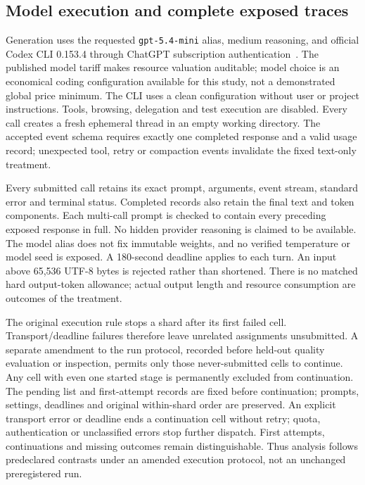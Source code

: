 \subsection{Model execution and complete exposed traces}
Generation uses the requested \texttt{gpt-5.4-mini} alias, medium reasoning, and official Codex CLI 0.153.4 through ChatGPT subscription authentication~\cite{openai54mini2026,codexexec2026}. The published model tariff makes resource valuation auditable; model choice is an economical coding configuration available for this study, not a demonstrated global price minimum. The CLI uses a clean configuration without user or project instructions. Tools, browsing, delegation and test execution are disabled. Every call creates a fresh ephemeral thread in an empty working directory. The accepted event schema requires exactly one completed response and a valid usage record; unexpected tool, retry or compaction events invalidate the fixed text-only treatment.

Every submitted call retains its exact prompt, arguments, event stream, standard error and terminal status. Completed records also retain the final text and token components. Each multi-call prompt is checked to contain every preceding exposed response in full. No hidden provider reasoning is claimed to be available. The model alias does not fix immutable weights, and no verified temperature or model seed is exposed. A 180-second deadline applies to each turn. An input above 65,536 UTF-8 bytes is rejected rather than shortened. There is no matched hard output-token allowance; actual output length and resource consumption are outcomes of the treatment.

The original execution rule stops a shard after its first failed cell. Transport/deadline failures therefore leave unrelated assignments unsubmitted. A separate amendment to the run protocol, recorded before held-out quality evaluation or inspection, permits only those never-submitted cells to continue. Any cell with even one started stage is permanently excluded from continuation. The pending list and first-attempt records are fixed before continuation; prompts, settings, deadlines and original within-shard order are preserved. An explicit transport error or deadline ends a continuation cell without retry; quota, authentication or unclassified errors stop further dispatch. First attempts, continuations and missing outcomes remain distinguishable. Thus analysis follows predeclared contrasts under an amended execution protocol, not an unchanged preregistered run.

